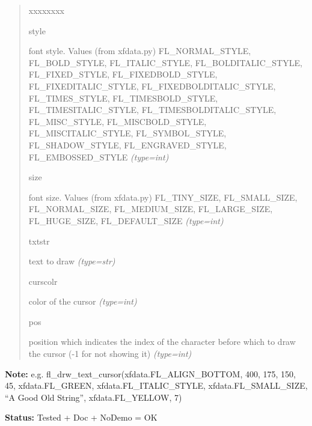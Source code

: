 \begin{boxedminipage}{\funcwidth}
\begin{quote}
\begin{Ventry}{xxxxxxxx}
          \item[style]


font style. Values (from xfdata.py) FL\_NORMAL\_STYLE, FL\_BOLD\_STYLE,
FL\_ITALIC\_STYLE, FL\_BOLDITALIC\_STYLE, FL\_FIXED\_STYLE,
FL\_FIXEDBOLD\_STYLE, FL\_FIXEDITALIC\_STYLE, FL\_FIXEDBOLDITALIC\_STYLE,
FL\_TIMES\_STYLE, FL\_TIMESBOLD\_STYLE, FL\_TIMESITALIC\_STYLE,
FL\_TIMESBOLDITALIC\_STYLE, FL\_MISC\_STYLE, FL\_MISCBOLD\_STYLE,
FL\_MISCITALIC\_STYLE, FL\_SYMBOL\_STYLE, FL\_SHADOW\_STYLE,
FL\_ENGRAVED\_STYLE, FL\_EMBOSSED\_STYLE
            {\it (type=int)}

          \item[size]


font size. Values (from xfdata.py) FL\_TINY\_SIZE, FL\_SMALL\_SIZE,
FL\_NORMAL\_SIZE, FL\_MEDIUM\_SIZE, FL\_LARGE\_SIZE, FL\_HUGE\_SIZE,
FL\_DEFAULT\_SIZE
            {\it (type=int)}

          \item[txtstr]


text to draw
            {\it (type=str)}

          \item[curscolr]


color of the cursor
            {\it (type=int)}

          \item[pos]


position which indicates the index of the character before which to
draw the cursor (-1 for not showing it)
            {\it (type=int)}

        \end{Ventry}

      \end{quote}

\textbf{Note:} 
e.g. fl\_drw\_text\_cursor(xfdata.FL\_ALIGN\_BOTTOM, 400, 175, 150, 45,
xfdata.FL\_GREEN, xfdata.FL\_ITALIC\_STYLE, xfdata.FL\_SMALL\_SIZE,
``A Good Old String'', xfdata.FL\_YELLOW, 7)


\textbf{Status:} 
Tested + Doc + NoDemo = OK


    \end{boxedminipage}

    \label{xformslib:flbasic:fl_drw_box}

    \vspace{0.5ex}

